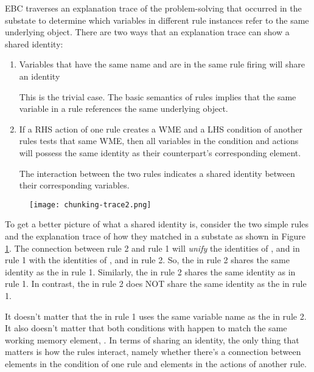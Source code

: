 EBC traverses an explanation trace of the problem-solving that occurred in the substate to determine which variables in different rule instances refer to the same underlying object.  There are two ways that an explanation trace can show a shared identity:

\begin{enumerate}
	\item Variables that have the same name and are in the same rule firing will share an identity

	This is the trivial case.  The basic semantics of rules implies that the same variable in a rule references the same underlying object.

	\item If a RHS action of one rule creates a WME and a LHS condition of another rules tests that same WME, then all variables in the condition and actions will possess the same identity as their counterpart's corresponding element.

	The interaction between the two rules indicates a shared identity between their corresponding variables.
\end{enumerate}


\begin{figure}[!ht]
	\centering
	\texttt{[image: chunking-trace2.png]}
	\label{fig:chunking-trace2}
\end{figure}
\vspace{6pt}

To get a better picture of what a shared identity is, consider the two simple rules and the explanation trace of how they matched in a substate as shown in Figure \ref{fig:chunking-trace2}. The connection between rule 2 and rule 1 will \textit{unify} the identities of ,  and  in rule 1 with the identities of ,  and  in rule 2.  So, the  in rule 2 shares the same identity as the  in rule 1.  Similarly, the  in rule 2 shares the same identity as  in rule 1.  In contrast, the  in rule 2 does NOT share the same identity as the  in rule 1.

It doesn't matter that the  in rule 1 uses the same variable name as the  in rule 2.  It also doesn't matter that both conditions with  happen to match the same working memory element, .  In terms of sharing an identity, the only thing that matters is how the rules interact, namely whether there's a connection between elements in the condition of one rule and elements in the actions of another rule.

